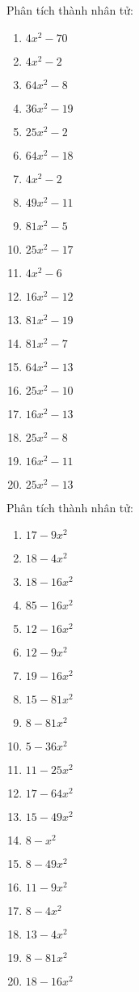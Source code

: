\documentclass[12pt,a4paper]{article}
\begin{document}
\begin{ex}
	Phân tích thành nhân tử:
	\begin{enumerate}
		\item ${4x^2 - 70}$
		\item ${4x^2 - 2}$
		\item ${64x^2 - 8}$
		\item ${36x^2 - 19}$
		\item ${25x^2 - 2}$
		\item ${64x^2 - 18}$
		\item ${4x^2 - 2}$
		\item ${49x^2 - 11}$
		\item ${81x^2 - 5}$
		\item ${25x^2 - 17}$
		\item ${4x^2 - 6}$
		\item ${16x^2 - 12}$
		\item ${81x^2 - 19}$
		\item ${81x^2 - 7}$
		\item ${64x^2 - 13}$
		\item ${25x^2 - 10}$
		\item ${16x^2 - 13}$
		\item ${25x^2 - 8}$
		\item ${16x^2 - 11}$
		\item ${25x^2 - 13}$
	\end{enumerate}
\end{ex}

\begin{ex}
	Phân tích thành nhân tử:
	\begin{enumerate}
		\item ${17 - 9x^2}$
		\item ${18 - 4x^2}$
		\item ${18 - 16x^2}$
		\item ${85 - 16x^2}$
		\item ${12 - 16x^2}$
		\item ${12 - 9x^2}$
		\item ${19 - 16x^2}$
		\item ${15 - 81x^2}$
		\item ${8 - 81x^2}$
		\item ${5 - 36x^2}$
		\item ${11 - 25x^2}$
		\item ${17 - 64x^2}$
		\item ${15 - 49x^2}$
		\item ${8 - x^2}$
		\item ${8 - 49x^2}$
		\item ${11 - 9x^2}$
		\item ${8 - 4x^2}$
		\item ${13 - 4x^2}$
		\item ${8 - 81x^2}$
		\item ${18 - 16x^2}$
	\end{enumerate}
\end{ex}
\end{document}
